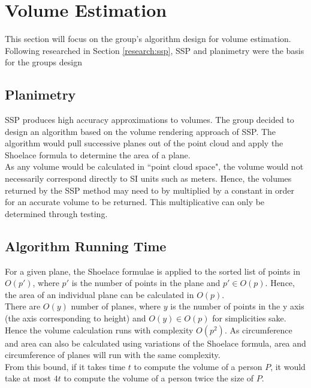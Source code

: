 \section{Volume Estimation}
\label{design:volume estimation}
This section will focus on the group's algorithm design for volume estimation. Following researched in Section \ref{research:ssp}, SSP and planimetry were the basis for the groups design

\subsection{Planimetry}
\label{design:planimetry}
SSP produces high accuracy approximations to volumes. The group decided to design an algorithm based on the volume rendering approach of SSP. The algorithm would pull successive planes out of the point cloud and apply the Shoelace formula to determine the area of a plane.\\

As any volume would be calculated in ``point cloud space", the volume would not necessarily correspond directly to SI units such as meters. Hence, the volumes returned by the SSP method may need to by multiplied by a constant in order for an accurate volume to be returned. This multiplicative can only be determined through testing.\\

\subsection{Algorithm Running Time}
For a given plane, the Shoelace formulae is applied to the sorted list of points in $O(p')$, where $p'$ is the number of points in the plane and $p' \in O(p)$. Hence, the area of an individual plane can be calculated in $O(p)$.\\ 

There are $O(y)$ number of planes, where $y$ is the number of points in the y axis (the axis corresponding to height) and $O(y) \in O(p)$ for simplicities sake. Hence the volume calculation runs with complexity $O(p^2)$. As circumference and area can also be calculated using variations of the Shoelace formula, area and circumference of planes will run with the same complexity.\\

From this bound, if it takes time $t$ to compute the volume of a person $P$, it would take at most $4t$ to compute the volume of a person twice the size of $P$.\\

